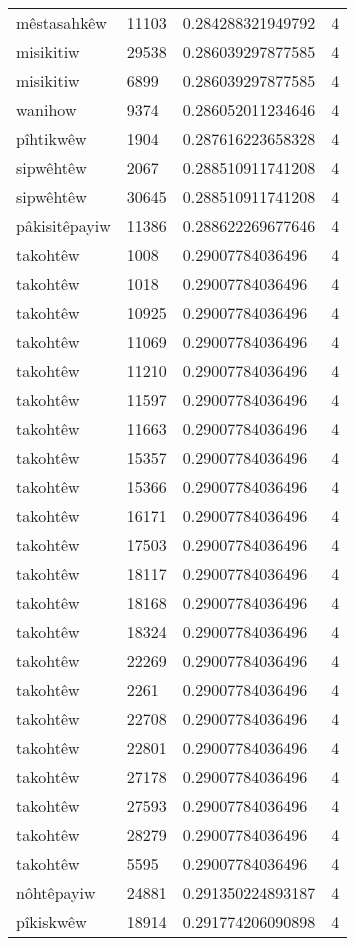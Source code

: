 \begin{longtable}{llll}
mêstasahkêw & 11103 & 0.284288321949792 & 4 \\
misikitiw & 29538 & 0.286039297877585 & 4 \\
misikitiw & 6899 & 0.286039297877585 & 4 \\
wanihow & 9374 & 0.286052011234646 & 4 \\
pîhtikwêw & 1904 & 0.287616223658328 & 4 \\
sipwêhtêw & 2067 & 0.288510911741208 & 4 \\
sipwêhtêw & 30645 & 0.288510911741208 & 4 \\
pâkisitêpayiw & 11386 & 0.288622269677646 & 4 \\
takohtêw & 1008 & 0.29007784036496 & 4 \\
takohtêw & 1018 & 0.29007784036496 & 4 \\
takohtêw & 10925 & 0.29007784036496 & 4 \\
takohtêw & 11069 & 0.29007784036496 & 4 \\
takohtêw & 11210 & 0.29007784036496 & 4 \\
takohtêw & 11597 & 0.29007784036496 & 4 \\
takohtêw & 11663 & 0.29007784036496 & 4 \\
takohtêw & 15357 & 0.29007784036496 & 4 \\
takohtêw & 15366 & 0.29007784036496 & 4 \\
takohtêw & 16171 & 0.29007784036496 & 4 \\
takohtêw & 17503 & 0.29007784036496 & 4 \\
takohtêw & 18117 & 0.29007784036496 & 4 \\
takohtêw & 18168 & 0.29007784036496 & 4 \\
takohtêw & 18324 & 0.29007784036496 & 4 \\
takohtêw & 22269 & 0.29007784036496 & 4 \\
takohtêw & 2261 & 0.29007784036496 & 4 \\
takohtêw & 22708 & 0.29007784036496 & 4 \\
takohtêw & 22801 & 0.29007784036496 & 4 \\
takohtêw & 27178 & 0.29007784036496 & 4 \\
takohtêw & 27593 & 0.29007784036496 & 4 \\
takohtêw & 28279 & 0.29007784036496 & 4 \\
takohtêw & 5595 & 0.29007784036496 & 4 \\
nôhtêpayiw & 24881 & 0.291350224893187 & 4 \\
pîkiskwêw & 18914 & 0.291774206090898 & 4 \\

\end{longtable}
